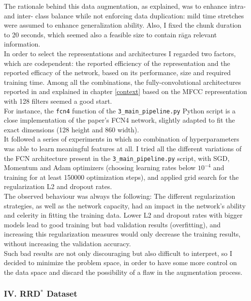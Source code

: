 The rationale behind this data augmentation, as explained, was to enhance intra- and inter- class balance while not enforcing data duplication: mild time stretches were assumed to enhance generalization ability. Also, I fixed the chunk duration to 20 seconds, which seemed also a feasible size to contain r\=aga relevant information.\\

In order to select the representations and architectures I regarded two factors, which are codependent: the reported efficiency of the representation and the reported efficacy of the network, based on its performance, size and required training time. Among all the combinations, the fully-convolutional architectures reported in \cite{choi-fcn} and explained in chapter \ref{context} based on the MFCC representation with 128 filters seemed a good start.\\

For instance, the \texttt{fcn4} function of the \texttt{3\_main\_pipeline.py} Python script is a close implementation of the paper's FCN4 network, slightly adapted to fit the exact dimensions (128 height and 860 width).\\

It followed a series of experiments in which no combination of hyperparameters was able to learn meaningful features at all. I tried all the different variations of the FCN architecture present in the \texttt{3\_main\_pipeline.py} script, with SGD, Momentum and Adam optimizers (choosing learning rates below \(10^{-4}\) and training for at least 150000 optimization steps), and applied grid search for the regularization L2 and dropout rates.\\

The observed behaviour was always the following: The different regularization strategies, as well as the network capacity, had an impact in the network's ability and celerity in fitting the training data. Lower L2 and dropout rates with bigger models lead to good training but bad validation results (overfitting), and increasing this regularization measures would only decrease the training results, without increasing the validation accuracy.\\

Such bad results are not only discouraging but also difficult to interpret, so I decided to minimize the problem space, in order to have some more control on the data space and discard the possibility of a flaw in the augmentation process.

\subsubsection{IV. RRD\(\boldsymbol{^*}\) Dataset}

